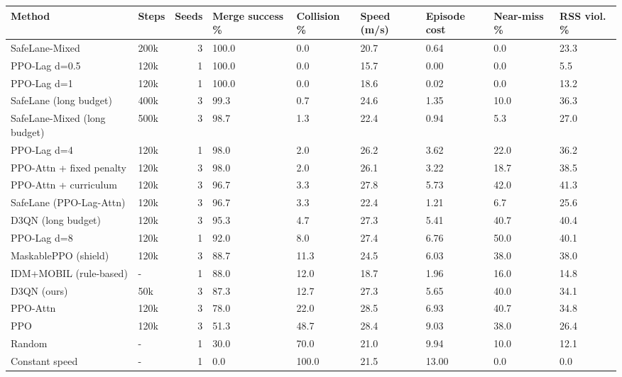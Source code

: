 \begin{tabular}{llrllllll}
\toprule
Method & Steps & Seeds & Merge success \% & Collision \% & Speed (m/s) & Episode cost & Near-miss \% & RSS viol. \% \\
\midrule
SafeLane-Mixed & 200k & 3 & 100.0 & 0.0 & 20.7 & 0.64 & 0.0 & 23.3 \\
PPO-Lag d=0.5 & 120k & 1 & 100.0 & 0.0 & 15.7 & 0.00 & 0.0 & 5.5 \\
PPO-Lag d=1 & 120k & 1 & 100.0 & 0.0 & 18.6 & 0.02 & 0.0 & 13.2 \\
SafeLane (long budget) & 400k & 3 & 99.3 & 0.7 & 24.6 & 1.35 & 10.0 & 36.3 \\
SafeLane-Mixed (long budget) & 500k & 3 & 98.7 & 1.3 & 22.4 & 0.94 & 5.3 & 27.0 \\
PPO-Lag d=4 & 120k & 1 & 98.0 & 2.0 & 26.2 & 3.62 & 22.0 & 36.2 \\
PPO-Attn + fixed penalty & 120k & 3 & 98.0 & 2.0 & 26.1 & 3.22 & 18.7 & 38.5 \\
PPO-Attn + curriculum & 120k & 3 & 96.7 & 3.3 & 27.8 & 5.73 & 42.0 & 41.3 \\
SafeLane (PPO-Lag-Attn) & 120k & 3 & 96.7 & 3.3 & 22.4 & 1.21 & 6.7 & 25.6 \\
D3QN (long budget) & 120k & 3 & 95.3 & 4.7 & 27.3 & 5.41 & 40.7 & 40.4 \\
PPO-Lag d=8 & 120k & 1 & 92.0 & 8.0 & 27.4 & 6.76 & 50.0 & 40.1 \\
MaskablePPO (shield) & 120k & 3 & 88.7 & 11.3 & 24.5 & 6.03 & 38.0 & 38.0 \\
IDM+MOBIL (rule-based) & - & 1 & 88.0 & 12.0 & 18.7 & 1.96 & 16.0 & 14.8 \\
D3QN (ours) & 50k & 3 & 87.3 & 12.7 & 27.3 & 5.65 & 40.0 & 34.1 \\
PPO-Attn & 120k & 3 & 78.0 & 22.0 & 28.5 & 6.93 & 40.7 & 34.8 \\
PPO & 120k & 3 & 51.3 & 48.7 & 28.4 & 9.03 & 38.0 & 26.4 \\
Random & - & 1 & 30.0 & 70.0 & 21.0 & 9.94 & 10.0 & 12.1 \\
Constant speed & - & 1 & 0.0 & 100.0 & 21.5 & 13.00 & 0.0 & 0.0 \\
\bottomrule
\end{tabular}
